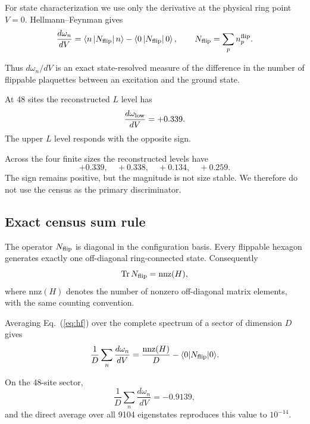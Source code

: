 \documentclass[
aps,
prl,
onecolumn,
amsmath,
amssymb,
superscriptaddress,
longbibliography
]{revtex4-2}
\begin{document}
For state characterization we use only the derivative at the
physical ring point $V=0$.
Hellmann--Feynman gives
\begin{equation}
\frac{d\omega_n}{dV}
=
\left\langle n\left|
N_{\rm flip}
\right|n\right\rangle
-
\left\langle0\left|
N_{\rm flip}
\right|0\right\rangle ,
\qquad
N_{\rm flip}
=
\sum_p n_p^{\rm flip}.
\label{eq:hf}
\end{equation}

Thus $d\omega_n/dV$ is an exact state-resolved measure of the
difference in the number of flippable plaquettes between an
excitation and the ground state.

At 48 sites the reconstructed $L$ level has
\begin{equation}
\frac{d\omega_{\rm low}}{dV}
=
+0.339.
\end{equation}
The upper $L$ level responds with the opposite sign.

Across the four finite sizes the reconstructed levels have
\begin{equation}
+0.339,\quad
+0.338,\quad
+0.134,\quad
+0.259 .
\end{equation}
The sign remains positive, but the magnitude is not size stable.
We therefore do not use the census as the primary discriminator.

\subsection{Exact census sum rule}

The operator $N_{\rm flip}$ is diagonal in the configuration basis.
Every flippable hexagon generates exactly one off-diagonal
ring-connected state.
Consequently
\begin{equation}
\mathrm{Tr}\,N_{\rm flip}
=
\mathrm{nnz}(H),
\end{equation}
where $\mathrm{nnz}(H)$ denotes the number of nonzero off-diagonal
matrix elements, with the same counting convention.

Averaging Eq.~(\ref{eq:hf}) over the complete spectrum of a sector of
dimension $D$ gives
\begin{equation}
\frac{1}{D}
\sum_n
\frac{d\omega_n}{dV}
=
\frac{
\mathrm{nnz}(H)
}{D}
-
\langle0|
N_{\rm flip}
|0\rangle .
\label{eq:census_sum}
\end{equation}

On the 48-site sector,
\begin{equation}
\frac{1}{D}
\sum_n
\frac{d\omega_n}{dV}
=
-0.9139,
\end{equation}
and the direct average over all 9104 eigenstates reproduces this value
to $10^{-14}$.
\end{document}
